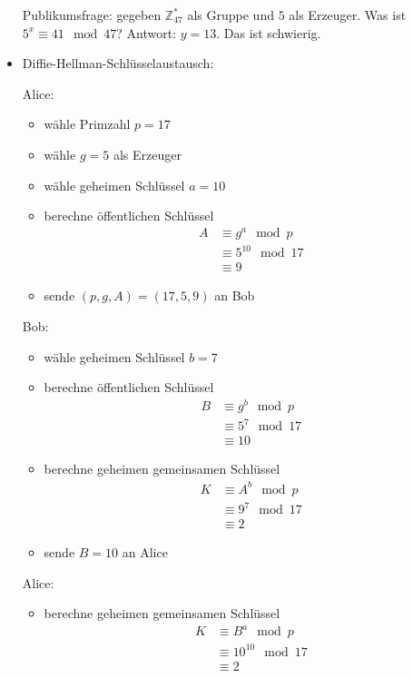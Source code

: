\documentclass[
  a4paper,
  11pt,
]{article}
\newcommand{\Z}{\mathbb{Z}}
\begin{document}
\begin{itemize}
    Publikumsfrage: gegeben $\Z_{47}^*$ als Gruppe und $5$ als Erzeuger. Was ist
    $5^x \equiv 41 \mod 47$? Antwort: $y = 13$. Das ist schwierig.

  \item Diffie-Hellman-Schlüsselaustausch:

    Alice:
    \begin{itemize}
      \item wähle Primzahl $p = 17$
      \item wähle $g = 5$ als Erzeuger
      \item wähle geheimen Schlüssel $a = 10$
      \item berechne öffentlichen Schlüssel
        \begin{align*}
          A & \equiv g^a \mod p\\
            & \equiv 5^{10} \mod 17\\
            & \equiv 9
        \end{align*}
      \item sende $(p, g, A) = (17, 5, 9)$ an Bob
    \end{itemize}

    Bob:
    \begin{itemize}
      \item wähle geheimen Schlüssel $b = 7$
      \item berechne öffentlichen Schlüssel
        \begin{align*}
          B & \equiv g^b \mod p\\
            & \equiv 5^7 \mod 17\\
            & \equiv 10
        \end{align*}
      \item berechne geheimen gemeinsamen Schlüssel
        \begin{align*}
          K & \equiv A^b \mod p\\
            & \equiv 9^7 \mod 17\\
            & \equiv 2
        \end{align*}
      \item sende $B = 10$ an Alice
    \end{itemize}

    Alice:
    \begin{itemize}
      \item berechne geheimen gemeinsamen Schlüssel
        \begin{align*}
          K & \equiv B^a \mod p\\
            & \equiv 10^{10} \mod 17\\
            & \equiv 2
        \end{align*}
    \end{itemize}


\end{itemize}
\end{document}
